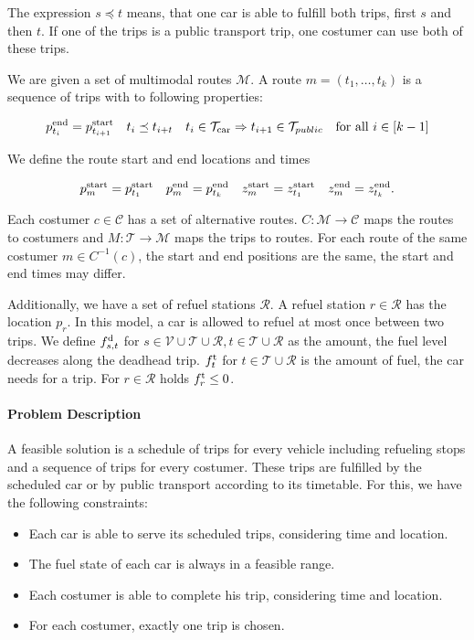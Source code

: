 The expression $s\preceq t$ means, that one car is able to fulfill both trips, first $s$ and then $t$. If one of the trips is a public transport trip, one costumer can use both of these trips.

We are given a set of multimodal routes $\mathcal{M}$. A route $m=\left(t_1,\dots,t_k\right)$ is a sequence of trips with to following properties:

\begin{align*}
	p^{\operatorname{end}}_{t_i} = p^{\operatorname{start}}_{t_{i+1}} & & t_i\preceq t_{i+t} & & t_i\in\mathcal{T}_{\operatorname{car}}\Rightarrow t_{i+1}\in\mathcal{T}_{public} & & \text{for all } i\in[k-1]
\end{align*}

We define the route start and end locations and times

\begin{align*}
	p^{\operatorname{start}}_m = p^{\operatorname{start}}_{t_1} & &  p^{\operatorname{end}}_m = p^{\operatorname{end}}_{t_k} & & z^{\operatorname{start}}_m = z^{\operatorname{start}}_{t_1} & & z^{\operatorname{end}}_m = z^{\operatorname{end}}_{t_k}.
\end{align*}

Each costumer $c\in\mathcal{C}$ has a set of alternative routes. $C:\mathcal{M}\to\mathcal{C}$ maps the routes to costumers and $M:\mathcal{T}\to\mathcal{M}$ maps the trips to routes. For each route of the same costumer $m\in C^{-1}(c)$, the start and end positions are the same, the start and end times may differ.

Additionally, we have a set of refuel stations $\mathcal{R}$. A refuel station $r\in\mathcal{R}$ has the location $p_r$. In this model, a car is allowed to refuel at most once between two trips. We define $f^{\operatorname{d}}_{s,t}$ for $s\in\mathcal{V}\cup\mathcal{T}\cup\mathcal{R},t\in\mathcal{T}\cup\mathcal{R}$ as the amount, the fuel level decreases along the deadhead trip. $f^{\operatorname{t}}_t$ for $t\in\mathcal{T}\cup\mathcal{R}$ is the amount of fuel, the car needs for a trip. For $r\in\mathcal{R}$ holds $f^{\operatorname{t}}_r \leq 0$. 

\paragraph{Problem Description} \parfill

A feasible solution is a schedule of trips for every vehicle including refueling stops and a sequence of trips for every costumer. These trips are fulfilled by the scheduled car or by public transport according to its timetable. For this, we have the following constraints:

\begin{itemize}
	\item{Each car is able to serve its scheduled trips, considering time and location.}
	\item{The fuel state of each car is always in a feasible range.}
	\item{Each costumer is able to complete his trip, considering time and location.}
	\item{For each costumer, exactly one trip is chosen.}
\end{itemize}

